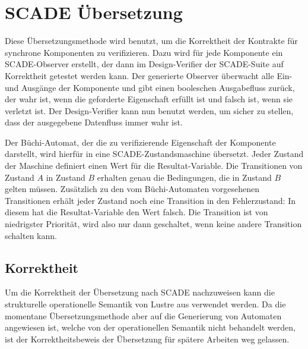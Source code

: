 \section{SCADE Übersetzung}
Diese Übersetzungsmethode wird benutzt, um die Korrektheit der Kontrakte für synchrone Komponenten zu verifizieren.
Dazu wird für jede Komponente ein SCADE-Observer erstellt, der dann im Design-Verifier der SCADE-Suite auf Korrektheit getestet werden kann.
Der generierte Observer überwacht alle Ein- und Ausgänge der Komponente und gibt einen booleschen Ausgabefluss zurück, der wahr ist, wenn die geforderte Eigenschaft erfüllt ist und falsch ist, wenn sie verletzt ist.
Der Design-Verifier kann nun benutzt werden, um sicher zu stellen, dass der ausgegebene Datenfluss immer wahr ist.

Der Büchi-Automat, der die zu verifizierende Eigenschaft der Komponente darstellt, wird hierfür in eine SCADE-Zustandsmaschine übersetzt.
Jeder Zustand der Maschine definiert einen Wert für die Resultat-Variable.
Die Transitionen von Zustand $A$ in Zustand $B$ erhalten genau die Bedingungen, die in Zustand $B$ gelten müssen.
Zusätzlich zu den vom Büchi-Automaten vorgesehenen Transitionen erhält jeder Zustand noch eine Transition in den Fehlerzustand:
In diesem hat die Resultat-Variable den Wert falsch.
Die Transition ist von niedrigster Priorität, wird also nur dann geschaltet, wenn keine andere Transition schalten kann.
\subsection{Korrektheit}
Um die Korrektheit der Übersetzung nach SCADE nachzuweisen kann die strukturelle operationelle Semantik von Lustre aus \cite{functional_lustre} verwendet werden.
Da die momentane Übersetzungsmethode aber auf die Generierung von Automaten angewiesen ist, welche von der operationellen Semantik nicht behandelt werden, ist der Korrektheitsbeweis der Übersetzung für spätere Arbeiten weg gelassen.